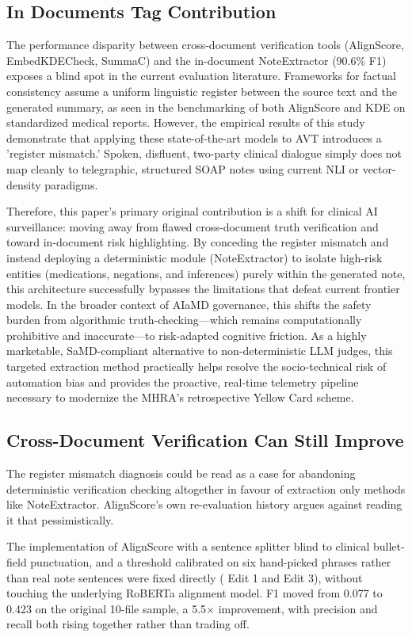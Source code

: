 \documentclass[11pt,a4paper]{article}
\begin{document}
\subsection{In Documents Tag Contribution}
The performance disparity between cross-document verification tools (AlignScore, EmbedKDECheck, SummaC) and the in-document NoteExtractor (90.6\% F1) exposes a  blind spot in the current evaluation literature. Frameworks for factual consistency assume a uniform linguistic register between the source text and the generated summary, as seen in the benchmarking of both AlignScore and KDE on standardized medical reports. However, the empirical results of this study demonstrate that applying these state-of-the-art models to AVT introduces a  'register mismatch.' Spoken, disfluent, two-party clinical dialogue simply does not map cleanly to telegraphic, structured SOAP notes using current NLI or vector-density paradigms.

Therefore, this paper’s primary original contribution is a shift for clinical AI surveillance: moving away from flawed cross-document truth verification and toward in-document risk highlighting. By conceding the register mismatch and instead deploying a deterministic module (NoteExtractor) to isolate high-risk entities (medications, negations, and inferences) purely within the generated note, this architecture successfully bypasses the limitations that defeat current frontier models. In the broader context of AIaMD governance, this shifts the safety burden from algorithmic truth-checking—which remains computationally prohibitive and inaccurate—to risk-adapted cognitive friction. As a highly marketable, SaMD-compliant alternative to non-deterministic LLM judges, this targeted extraction method practically helps resolve the socio-technical risk of automation bias and provides the proactive, real-time telemetry pipeline necessary to modernize the MHRA's retrospective Yellow Card scheme.

\subsection{Cross-Document Verification Can Still Improve}

The register mismatch diagnosis could be read as a case for abandoning deterministic verification checking altogether in favour of extraction only methods like NoteExtractor. AlignScore’s own re-evaluation history argues against reading it that pessimistically.

The implementation of AlignScore with a sentence splitter blind to clinical bullet-field punctuation, and a threshold calibrated on six hand-picked phrases rather than real note sentences were fixed directly  ( Edit 1 and Edit 3), without touching the underlying RoBERTa alignment model. F1 moved from 0.077 to 0.423 on the original 10-file sample, a 5.5× improvement, with precision and recall both rising together rather than trading off.  
\end{document}
